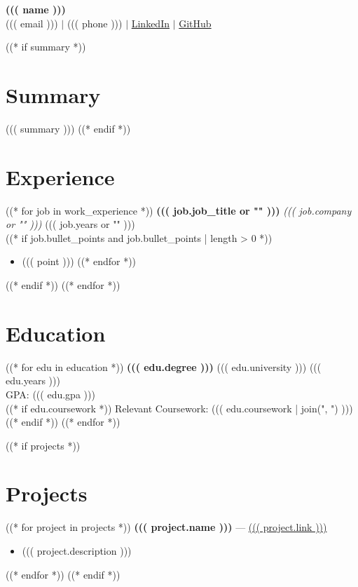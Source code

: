 \documentclass[a4paper,10pt]{article}
\begin{document}
\begin{center}
    {\LARGE \textbf{((( name )))}}\\
    ((( email ))) $|$ ((( phone ))) $|$ \href{((( linkedin )))}{LinkedIn} $|$ \href{((( github )))}{GitHub}
\end{center}

((* if summary *))
\section*{Summary}
((( summary )))
((* endif *))

\section*{Experience}
((* for job in work_experience *))
\textbf{((( job.job_title or "" )))}
\hfill 
\textit{((( job.company or "" )))}
\hfill 
((( job.years or "" )))\\
((* if job.bullet_points and job.bullet_points | length > 0 *))
\begin{itemize}[leftmargin=1.5em]
((* for point in job.bullet_points *))
    \item ((( point )))
((* endfor *))
\end{itemize}
((* endif *))
((* endfor *))



\section*{Education}
((* for edu in education *))
\textbf{((( edu.degree )))} \hfill ((( edu.university ))) \hfill ((( edu.years )))\\
GPA: ((( edu.gpa )))\\
((*  if edu.coursework *))
Relevant Coursework: ((( edu.coursework | join(", ") )))
((* endif *))
((* endfor *))

((* if projects *))
\section*{Projects}
((* for project in projects *))
\textbf{((( project.name )))} --- \href{((( project.link )))}{((( project.link )))}
\begin{itemize}[leftmargin=1.5em]
    \item ((( project.description )))
\end{itemize}
((* endfor *))
((* endif *))
\end{document}
